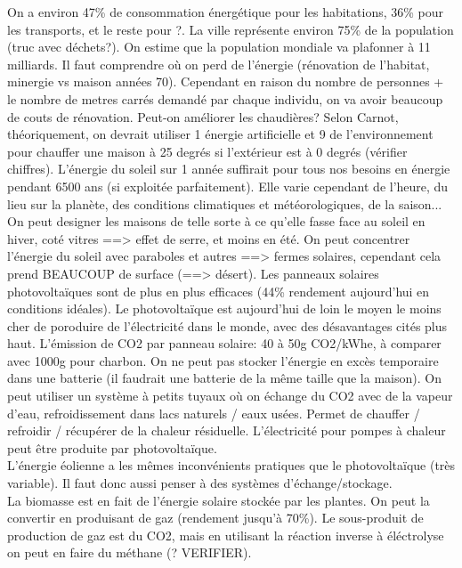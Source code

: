 \documentclass{article}
\begin{document}
On a environ 47\% de consommation énergétique pour les habitations, 36\% pour les transports, et le reste pour ?. La ville représente environ 75\% de la population (truc avec déchets?). On estime que la population mondiale va plafonner à 11 milliards. Il faut comprendre où on perd de l'énergie (rénovation de l'habitat, minergie vs maison années 70). Cependant en raison du nombre de personnes + le nombre de metres carrés demandé par chaque individu, on va avoir beaucoup de couts de rénovation. Peut-on améliorer les chaudières? Selon Carnot, théoriquement, on devrait utiliser 1 énergie artificielle et 9 de l'environnement pour chauffer une maison à 25 degrés si l'extérieur est à 0 degrés (vérifier chiffres). L'énergie du soleil sur 1 année suffirait pour tous nos besoins en énergie pendant 6500 ans (si exploitée parfaitement). Elle varie cependant de l'heure, du lieu sur la planète, des conditions climatiques et météorologiques, de la saison... On peut designer les maisons de telle sorte à ce qu'elle fasse face au soleil en hiver, coté vitres ==> effet de serre, et moins en été. On peut concentrer l'énergie du soleil avec paraboles et autres ==> fermes solaires, cependant cela prend BEAUCOUP de surface (==> désert). Les panneaux solaires photovoltaïques sont de plus en plus efficaces (44\% rendement aujourd'hui en conditions idéales). Le photovoltaïque est aujourd'hui de loin le moyen le moins cher de poroduire de l'électricité dans le monde, avec des désavantages cités plus haut. L'émission de CO2 par panneau solaire: 40 à 50g CO2/kWhe, à comparer avec 1000g pour charbon. On ne peut pas stocker l'énergie en excès temporaire dans une batterie (il faudrait une batterie de la même taille que la maison). On peut utiliser un système à petits tuyaux où on échange du CO2 avec de la vapeur d'eau, refroidissement dans lacs naturels / eaux usées. Permet de chauffer / refroidir / récupérer de la chaleur résiduelle. L'électricité pour pompes à chaleur peut être produite par photovoltaïque. \\

 L'énergie éolienne a les mêmes inconvénients pratiques que le photovoltaïque (très variable). Il faut donc aussi penser à des systèmes d'échange/stockage.  \\

 La biomasse est en fait de l'énergie solaire stockée par les plantes. On peut la convertir en produisant de gaz (rendement jusqu'à 70\%). Le sous-produit de production de gaz est du CO2, mais en utilisant la réaction inverse à éléctrolyse on peut en faire du méthane (? VERIFIER).  \\
\end{document}

